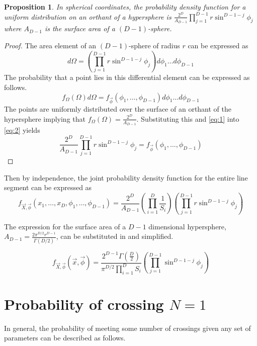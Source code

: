 \documentclass{article}
\newtheorem{proposition}{Proposition}
\begin{document}
\begin{proposition}
In spherical coordinates, the probability density function for a uniform distribution on an orthant of a hypersphere is $\frac{2^D}{A_{D-1}}\prod_{j=1}^{D-1}r\sin^{D-1-j}\phi_j$ where
$A_{D-1}$ is the surface area of a $(D-1)$-sphere.
\end{proposition}
\begin{proof}
	The area element of an $(D-1)$-sphere of radius $r$ can be expressed as 
	\begin{equation} \label{eq:1}
	d\Omega = \left(\prod_{j=1}^{D-1}r\sin^{D-1-j}\phi_j\right)d\phi_1 \hdots d\phi_{D-1}
	\end{equation}
	The probability that a point lies in this differential element can be expressed as follows.
	\begin{equation} \label{eq:2}
	f_{\Omega}(\Omega)d\Omega = f_{\vec{\phi}}(\phi_1, \hdots, \phi_{D-1})d\phi_1 \hdots d\phi_{D-1}
	\end{equation}
	The points are uniformly distributed over the surface of an orthant of the hypersphere implying that $f_{\Omega}(\Omega) = \frac{2^D}{A_{D-1}}$. Substituting this and
	\ref{eq:1} into \ref{eq:2} yields
	\begin{equation}
	\frac{2^D}{A_{D-1}}\prod_{j=1}^{D-1}r\sin^{D-1-j}\phi_j = f_{\vec{\phi}}(\phi_1, \hdots, \phi_{D-1})
	\end{equation}
\end{proof}

Then by independence, the joint probability density function for the entire line segment can be expressed as 
\begin{equation} 
	f_{\vec{X},\vec{\phi}}(x_1, \hdots, x_D, \phi_1, \hdots, \phi_{D-1}) = \frac{2^D}{A_{D-1}}\left(\prod_{i=1}^D\frac{1}{S_i}\right)\left(\prod_{j=1}^{D-1}r\sin^{D-1-j}\phi_j\right)
\end{equation} 

The expression for the surface area of a $D-1$ dimensional hypersphere, $A_{D-1}=\frac{2\pi^{D/2}r^{D-1}}{\Gamma(D/2)}$,
can be substituted in and simplified.

\begin{equation}\label{eq:general pdf}
	f_{\vec{X},\vec{\phi}}(\vec{x}, \vec{\phi}) = \frac{2^{D-1}\Gamma(\frac{D}{2})}{\pi^{D/2}\prod_{i=1}^DS_i} \left(\prod_{j=1}^{D-1}\sin^{D-1-j}\phi_j\right)
\end{equation}

\section{Probability of crossing $N=1$}
In general, the probability of meeting some number of crossings given any set of parameters can be described as follows.
\end{document}
